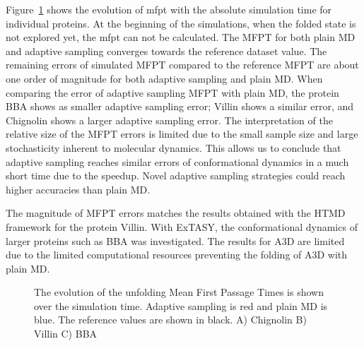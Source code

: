 Figure~\ref{fig:mfpt} shows the evolution of mfpt with the absolute simulation time for individual proteins. At the beginning of the simulations, when the folded state is not explored yet, the mfpt can not be calculated. The MFPT for both plain MD and adaptive sampling converges towards the reference dataset value. The remaining errors of simulated MFPT compared to the reference MFPT are about one order of magnitude for both adaptive sampling and plain MD. When comparing the error of adaptive sampling MFPT with plain MD, the protein BBA shows as smaller adaptive sampling error; Villin shows a similar error, and Chignolin shows a larger adaptive sampling error. The interpretation of the relative size of the MFPT errors is limited due to the small sample size and large stochasticity inherent to molecular dynamics. This allows us to conclude that adaptive sampling reaches similar errors of conformational dynamics in a much short time due to the speedup. Novel adaptive sampling strategies could reach higher accuracies than plain MD. 


The magnitude of MFPT errors matches the results obtained with the HTMD framework \cite{doerr2016htmd} for the protein Villin. With ExTASY, the conformational dynamics of larger proteins such as BBA was investigated. The results for A3D are limited due to the limited computational resources preventing the folding of A3D with plain MD.  
\begin{figure}[H]
\centering
   \begin{subfigure}[b]{0.5\linewidth}
   {}
   \end{subfigure}%
   
   \begin{subfigure}[b]{0.5\linewidth}
   {}
   \end{subfigure}%
   
   \begin{subfigure}[b]{0.5\linewidth}
   {}
    \end{subfigure}%
  \caption{
  The evolution of the unfolding Mean First Passage Times is shown over the simulation time. Adaptive sampling is red and plain MD is blue. The reference values are shown in black.
  A) Chignolin B) Villin C) BBA } 
  \label{fig:mfpt}
\end{figure}


